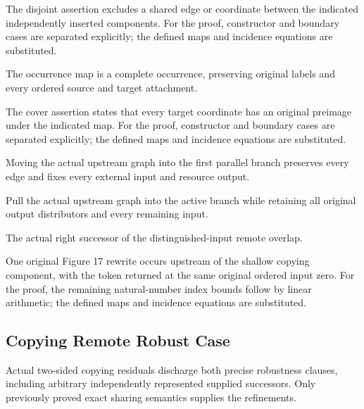 The disjoint assertion excludes a shared edge or coordinate between the indicated independently inserted components.
For the proof, constructor and boundary cases are separated explicitly; the defined maps and incidence equations are substituted.
\par{}

The occurrence map is a complete occurrence, preserving original labels and every ordered source and target attachment.
\par{}

The cover assertion states that every target coordinate has an original preimage under the indicated map.
For the proof, constructor and boundary cases are separated explicitly; the defined maps and incidence equations are substituted.
\par{}

Moving the actual upstream graph into the first parallel branch preserves every edge and fixes every external input and resource output.
\par{}

Pull the actual upstream graph into the active branch while retaining all original output distributors and every remaining input.
\par{}

The actual right successor of the distinguished-input remote overlap.
\par{}

One original Figure 17 rewrite occurs upstream of the shallow copying component, with the token returned at the same original ordered input zero.
For the proof, the remaining natural-number index bounds follow by linear arithmetic; the defined maps and incidence equations are substituted.
\par{}

\subsection{Copying Remote Robust Case}
Actual two-sided copying residuals discharge both precise robustness clauses, including arbitrary independently represented supplied successors. Only previously proved exact sharing semantics supplies the refinements.

